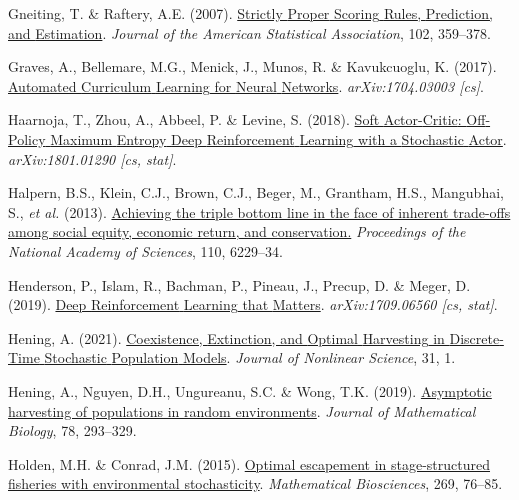 \documentclass[3p]{elsarticle} %
\newlength{\cslhangindent}
\newenvironment{CSLReferences}[2] %
 {%
  \setlength{\parindent}{0pt}
  \ifodd #1 \everypar{\setlength{\hangindent}{\cslhangindent}}\ignorespaces\fi
  \ifnum #2 > 0
  \setlength{\parskip}{#2\baselineskip}
  \fi
 }%
 {}
\begin{document}
\begin{CSLReferences}{1}{0}
\leavevmode{}%
Gneiting, T. \& Raftery, A.E. (2007).
\href{https://doi.org/10.1198/016214506000001437}{Strictly {Proper}
{Scoring} {Rules}, {Prediction}, and {Estimation}}. \emph{Journal of the
American Statistical Association}, 102, 359--378.

\leavevmode{}%
Graves, A., Bellemare, M.G., Menick, J., Munos, R. \& Kavukcuoglu, K.
(2017). \href{http://arxiv.org/abs/1704.03003}{Automated {Curriculum}
{Learning} for {Neural} {Networks}}. \emph{arXiv:1704.03003 {[}cs{]}}.

\leavevmode{}%
Haarnoja, T., Zhou, A., Abbeel, P. \& Levine, S. (2018).
\href{http://arxiv.org/abs/1801.01290}{Soft {Actor}-{Critic}:
{Off}-{Policy} {Maximum} {Entropy} {Deep} {Reinforcement} {Learning}
with a {Stochastic} {Actor}}. \emph{arXiv:1801.01290 {[}cs, stat{]}}.

\leavevmode{}%
Halpern, B.S., Klein, C.J., Brown, C.J., Beger, M., Grantham, H.S.,
Mangubhai, S., \emph{et al.} (2013).
\href{https://doi.org/10.1073/pnas.1217689110}{Achieving the triple
bottom line in the face of inherent trade-offs among social equity,
economic return, and conservation.} \emph{Proceedings of the National
Academy of Sciences}, 110, 6229--34.

\leavevmode{}%
Henderson, P., Islam, R., Bachman, P., Pineau, J., Precup, D. \& Meger,
D. (2019). \href{http://arxiv.org/abs/1709.06560}{Deep {Reinforcement}
{Learning} that {Matters}}. \emph{arXiv:1709.06560 {[}cs, stat{]}}.

\leavevmode{}%
Hening, A. (2021).
\href{https://doi.org/10.1007/s00332-020-09667-0}{Coexistence,
{Extinction}, and {Optimal} {Harvesting} in {Discrete}-{Time}
{Stochastic} {Population} {Models}}. \emph{Journal of Nonlinear
Science}, 31, 1.

\leavevmode{}%
Hening, A., Nguyen, D.H., Ungureanu, S.C. \& Wong, T.K. (2019).
\href{https://doi.org/10.1007/s00285-018-1275-1}{Asymptotic harvesting
of populations in random environments}. \emph{Journal of Mathematical
Biology}, 78, 293--329.

\leavevmode{}%
Holden, M.H. \& Conrad, J.M. (2015).
\href{http://dx.doi.org/10.1016/j.mbs.2015.08.021}{Optimal escapement in
stage-structured fisheries with environmental stochasticity}.
\emph{Mathematical Biosciences}, 269, 76--85.


\end{CSLReferences}
\end{document}
